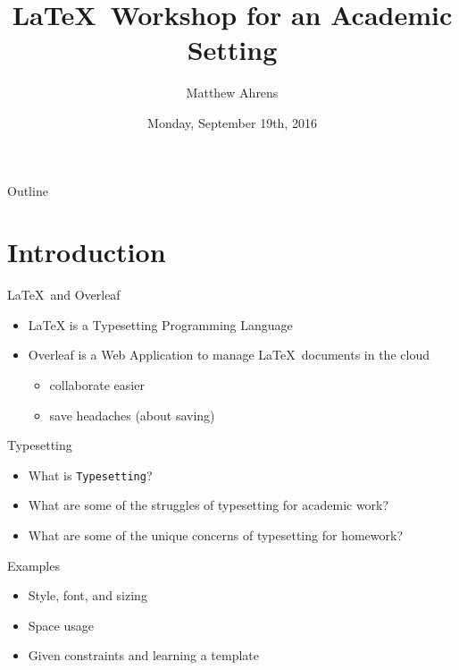 \documentclass{beamer}
\title[LaTeX Workshop]{\LaTeX\ Workshop for an Academic Setting}
\author{Matthew Ahrens}
\institute{CSLOL - Tufts University}
\date{Monday, September 19th, 2016}
\begin{document}
\begin{frame}
  \titlepage
\end{frame}

\begin{frame}{Outline}
\begin{multicols}{2}
  \tableofcontents
\end{multicols}
\end{frame}

\section{Introduction}

\begin{frame}{\LaTeX\ and Overleaf}
\begin{itemize}
  \item LaTeX is a Typesetting Programming Language
  \item Overleaf is a Web Application to manage \LaTeX\ documents in the cloud
  \begin{itemize}
    \item collaborate easier
    \item save headaches (about saving)
  \end{itemize}
\end{itemize}
\end{frame}

\begin{frame}{Typesetting }
\begin{itemize}
  \item What is \texttt{Typesetting}?
  \item What are some of the struggles of typesetting for academic work?
  \item What are some of the unique concerns of typesetting for homework?
\end{itemize}

\vskip 1cm

\begin{block}{Examples}
  \begin{itemize}
    \item Style, font, and sizing
    \item Space usage
    \item Given constraints and learning a template
  \end{itemize}
\end{block}

\end{frame}
\end{document}
